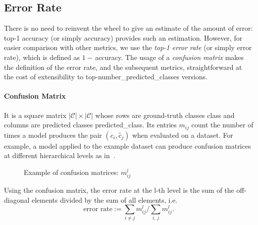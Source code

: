 \subsection{Error Rate}
\label{subsec:error-rate}
There is no need to reinvent the wheel to give an estimate of the amount of error: top-1 accuracy (or simply accuracy) provides such an estimation.
However, for easier comparison with other metrics, we use the \emph{top-1 error rate} (or simply error rate), which is defined as $1 - \,$accuracy. The usage of a \emph{confusion matrix} makes the definition of the error rate, and the subsequent metrics, straightforward at the cost of extensibility to top-\gls{number_predicted_classes} versions.

\paragraph{Confusion Matrix}
\label{par:confusion-matrix}
It is a square matrix $|\mathcal{C}| \times |\mathcal{C}|$ whose rows are ground-truth classes \gls{class} and columns are predicted classes \gls{predicted_class}. Its entries $m_{ij}$ count the number of times a model produces the pair $(c_i, \hat{c}_j)$ when evaluated on a dataset.
For example, a model applied to the example dataset can produce confusion matrices at
different hierarchical levels as in~.
\begin{figure}[htbp]
  \centering
  \begin{subfigure}{0.35\textwidth}
  \end{subfigure}
  \begin{subfigure}{0.30\textwidth}
  \end{subfigure}
  \begin{subfigure}{0.25\textwidth}
  \end{subfigure}
  \caption{Example of confusion matrices: $m_{ij}^l$}
  \label{fig:04/confusion-matrices}
\end{figure}
\medskip

Using the confusion matrix, the error rate at the l-th level is the sum of the off-diagonal elements divided by the sum of all elements, i.e.\
\begin{equation}
  \textrm{error rate} :=
  \sum_{i \ne j} m_{ij}^l \bigg/ \sum_{i, \,j} m_{ij}^l.
  \label{eq:error-rate}
\end{equation}


